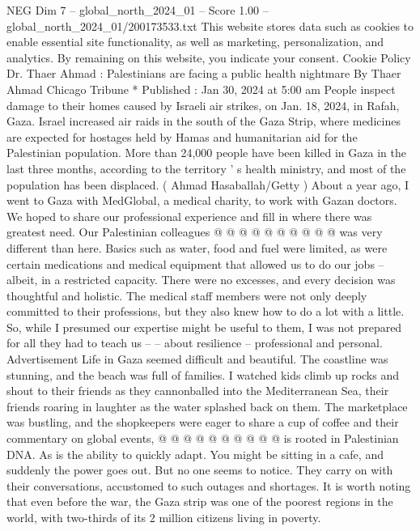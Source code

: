 \begin{textsample}{NEG Dim 7 – global\_north\_2024\_01 – Score 1.00 – global\_north\_2024\_01/200173533.txt}  \label{ex:f7_neg_267}
This website stores data such as cookies to enable essential site functionality, as well as marketing, personalization, and analytics.
By remaining on this website, you indicate your consent.
Cookie Policy Dr.
Thaer Ahmad : Palestinians are facing a public health nightmare By Thaer Ahmad Chicago Tribune * Published : Jan 30, 2024 at 5:00 am People inspect damage to their homes caused by Israeli air strikes, on Jan. 18, 2024, in Rafah, Gaza.
Israel increased air raids in the south of the Gaza Strip, where medicines are expected for hostages held by Hamas and humanitarian aid for the Palestinian population.
More than 24,000 people have been killed in Gaza in the last three months, according to the territory ' s health ministry, and most of the population has been displaced. ( Ahmad Hasaballah/Getty ) About a year ago, I went to Gaza with MedGlobal, a medical charity, to work with Gazan doctors.
We hoped to share our professional experience and fill in where there was greatest need.
Our Palestinian colleagues @ @ @ @ @ @ @ @ @ @ was very different than here.
Basics such as water, food and fuel were limited, as were certain medications and medical equipment that allowed us to do our jobs -- albeit, in a restricted capacity.
There were no excesses, and every decision was thoughtful and holistic.
The medical staff members were not only deeply committed to their professions, but they also knew how to do a lot with a little.
So, while I presumed our expertise might be useful to them, I was not prepared for all they had to teach us -- -- about resilience -- professional and personal.
Advertisement Life in Gaza seemed difficult and beautiful.
The coastline was stunning, and the beach was full of families.
I watched kids climb up rocks and shout to their friends as they cannonballed into the Mediterranean Sea, their friends roaring in laughter as the water splashed back on them.
The marketplace was bustling, and the shopkeepers were eager to share a cup of coffee and their commentary on global events, @ @ @ @ @ @ @ @ @ @ is rooted in Palestinian DNA.
As is the ability to quickly adapt.
You might be sitting in a cafe, and suddenly the power goes out.
But no one seems to notice.
They carry on with their conversations, accustomed to such outages and shortages.
It is worth noting that even before the war, the Gaza strip was one of the poorest regions in the world, with two-thirds of its 2 million citizens living in poverty.

\end{textsample}

